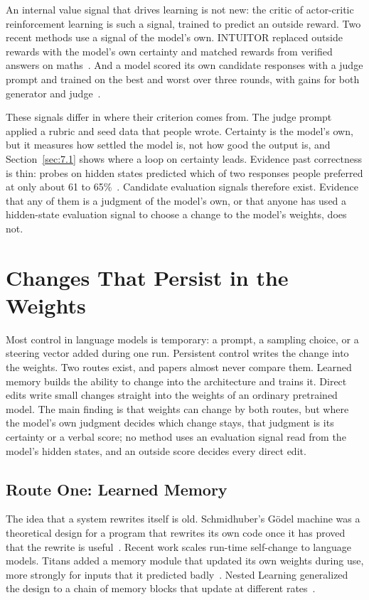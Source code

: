 \documentclass[journal]{IEEEtran}
\begin{document}
An internal value signal that drives learning is not new: the critic of actor-critic reinforcement learning is such a signal, trained to predict an outside reward. Two recent methods use a signal of the model's own. INTUITOR replaced outside rewards with the model's own certainty and matched rewards from verified answers on maths~\cite{Zhao2025}. And a model scored its own candidate responses with a judge prompt and trained on the best and worst over three rounds, with gains for both generator and judge~\cite{Yuan2024}.

These signals differ in where their criterion comes from. The judge prompt applied a rubric and seed data that people wrote. Certainty is the model's own, but it measures how settled the model is, not how good the output is, and Section~\ref{sec:7.1} shows where a loop on certainty leads. Evidence past correctness is thin: probes on hidden states predicted which of two responses people preferred at only about 61 to 65\%~\cite{Kirin2026}. Candidate evaluation signals therefore exist. Evidence that any of them is a judgment of the model's own, or that anyone has used a hidden-state evaluation signal to choose a change to the model's weights, does not.

\section{Changes That Persist in the Weights}\label{sec:6}

Most control in language models is temporary: a prompt, a sampling choice, or a steering vector added during one run. Persistent control writes the change into the weights. Two routes exist, and papers almost never compare them. Learned memory builds the ability to change into the architecture and trains it. Direct edits write small changes straight into the weights of an ordinary pretrained model. The main finding is that weights can change by both routes, but where the model's own judgment decides which change stays, that judgment is its certainty or a verbal score; no method uses an evaluation signal read from the model's hidden states, and an outside score decides every direct edit.

\subsection{Route One: Learned Memory}\label{sec:6.1}

The idea that a system rewrites itself is old. Schmidhuber's Gödel machine was a theoretical design for a program that rewrites its own code once it has proved that the rewrite is useful~\cite{Schmidhuber2003}. Recent work scales run-time self-change to language models. Titans added a memory module that updated its own weights during use, more strongly for inputs that it predicted badly~\cite{Behrouz2025a}. Nested Learning generalized the design to a chain of memory blocks that update at different rates~\cite{Behrouz2025b}.
\end{document}
